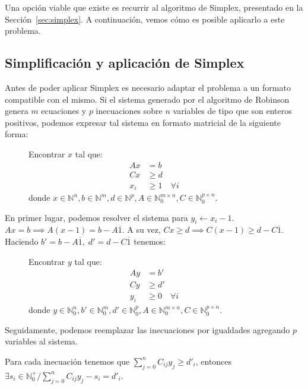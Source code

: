 Una opción viable que existe es recurrir al algoritmo de Simplex, presentado en la Sección~\ref{sec:simplex}. A continuación, vemos cómo es posible aplicarlo a este problema.

\subsection{Simplificación y aplicación de Simplex}
Antes de poder aplicar Simplex es necesario adaptar el problema a un formato compatible con el mismo. Si el sistema generado por el algoritmo de Robinson genera $m$ ecuaciones y $p$ inecuaciones sobre $n$ variables de tipo que son enteros positivos, podemos expresar tal sistema en formato matricial de la siguiente forma:

\begin{figure}[H]
\begin{mdframed}
Encontrar $x$ tal que:
\begin{align*}
    Ax &= b \\
    Cx &\geq d \\
    x_i &\geq 1\quad \forall i
\end{align*}
donde $x\in\mathbb{N}^n, b\in\mathbb{N}^m, d\in\mathbb{N}^p, A\in\mathbb{N}^{m\times n}_0,C\in\mathbb{N}^{p\times n}_0$.
\end{mdframed}
\end{figure}
\vspace{-2\baselineskip}
En primer lugar, podemos resolver el sistema para $y_i \leftarrow x_i-1$.
$Ax = b \implies A(x-1) = b - A\overline{1}$. A su vez, $Cx \geq d \implies C(x-1) \geq d - C\overline{1}$. Haciendo $b'=b - A\overline{1}, \;d'=d - C\overline{1}$ tenemos:
\begin{figure}[H]
\begin{mdframed}
Encontrar $y$ tal que:
\begin{align*}
    Ay &= b' \\
    Cy &\geq d' \\
    y_i &\geq 0\quad \forall i
\end{align*}
donde $y\in\mathbb{N}^n_0, b'\in\mathbb{N}^m_0, d'\in\mathbb{N}^p_0, A\in\mathbb{N}^{m\times n}_0,C\in\mathbb{N}^{p\times n}_0$.
\end{mdframed}
\end{figure}
\vspace{-2\baselineskip}
Seguidamente, podemos reemplazar las inecuaciones por igualdades agregando $p$ variables al sistema.

Para cada inecuación tenemos que $\sum_{j=0}^n C_{ij} y_j \geq d'_i$, entonces $\exists s_i\in\mathbb{N}_0^+ / \sum_{j=0}^n C_{ij} y_j - s_i = d'_i$.

